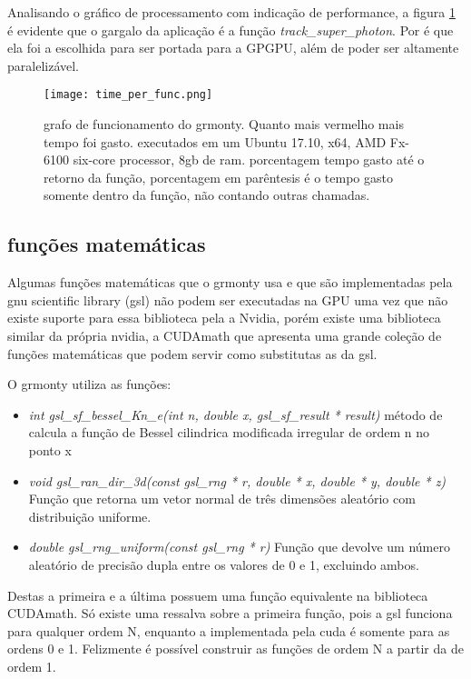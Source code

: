     Analisando o gráfico de processamento com indicação de performance, a figura \ref{fig:grmonty-performance} é evidente que o gargalo da aplicação é a função \textit{track\_super\_photon}. Por é que ela foi a escolhida para ser portada para a GPGPU, além de poder ser altamente paralelizável.

    \begin{figure}[!h]
      \centering
      \texttt{[image: time\_per\_func.png]}
      \caption{grafo de funcionamento do grmonty. Quanto mais vermelho mais tempo foi gasto. executados em um Ubuntu 17.10, x64, AMD Fx-6100 six-core processor, 8gb de ram. porcentagem tempo gasto até o retorno da função, porcentagem em parêntesis é o tempo gasto somente dentro da função, não contando outras chamadas.}
      \label{fig:grmonty-performance}
    \end{figure}

  \subsection{funções matemáticas}
    Algumas funções matemáticas que o grmonty usa e que são implementadas pela gnu scientific library (gsl) não podem ser executadas na GPU uma vez que não existe suporte para essa biblioteca pela a Nvidia, porém existe uma biblioteca similar da própria nvidia, a CUDAmath que apresenta uma grande coleção de funções matemáticas que podem servir como substitutas as da gsl.

    O grmonty utiliza as funções:
    \begin{itemize}
      \item \textit{int gsl\_sf\_bessel\_Kn\_e(int n, double x, gsl\_sf\_result * result)} método de calcula a função de Bessel cilindrica modificada irregular de ordem n no ponto x
      \item \textit{void gsl\_ran\_dir\_3d(const gsl\_rng * r, double * x, double * y, double * z)} Função que retorna um vetor normal de três dimensões aleatório com distribuição uniforme.
      \item \textit{double gsl\_rng\_uniform(const gsl\_rng * r)} Função que devolve um número aleatório de precisão dupla entre os valores de 0 e 1, excluindo ambos.
    \end{itemize}

    Destas a primeira e a última possuem uma função equivalente na biblioteca CUDAmath. Só existe uma ressalva sobre a primeira função, pois a gsl funciona para qualquer ordem N, enquanto a implementada pela cuda é somente para as ordens 0 e 1. Felizmente é possível construir as funções de ordem N a partir da de ordem 1.

